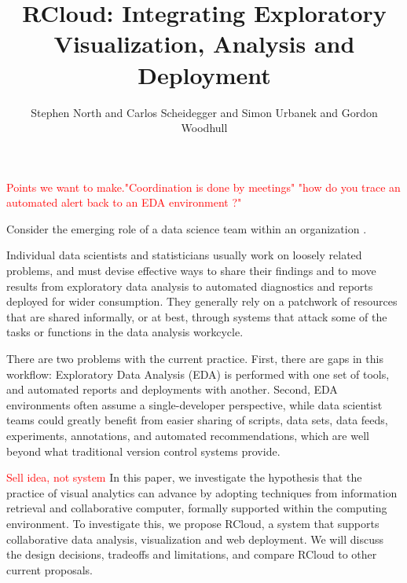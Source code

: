 \documentclass[review,journal]{vgtc}         %
\title{RCloud: Integrating Exploratory Visualization, Analysis and Deployment}
\author{Stephen North and Carlos Scheidegger and Simon Urbanek and
  Gordon Woodhull}
\newcommand{\todo}[1]{\textcolor{red}{#1}}
\begin{document}



\maketitle

\todo{Points we want to make."Coordination is done by meetings" "how do you trace an automated alert back to an EDA environment ?"}

Consider the emerging role of a data science team within an
organization \cite{Keim:2008:VAS}.

Individual data scientists and statisticians usually
work on loosely related problems, and must devise effective ways to 
share their findings and to move results from exploratory data analysis
to automated diagnostics and reports deployed for wider consumption.
They generally rely on a patchwork of resources that are shared informally,
or at best, through systems that attack some of the tasks or functions in
the data analysis workcycle.

There are two problems with the current
practice. First, there are gaps in this workflow:
Exploratory Data Analysis (EDA) is performed with one set of tools,
and automated reports and deployments with another.
Second, EDA environments often assume a single-developer perspective,
while data scientist teams could greatly benefit from easier sharing of
scripts, data sets, data feeds, experiments, annotations, and automated
recommendations, which are well beyond what traditional version control systems provide. 

\todo{Sell idea, not system} In this paper, we investigate the hypothesis
that the practice of visual analytics can advance by adopting techniques
from information retrieval and collaborative computer, formally supported
within the computing environment. To investigate this, we propose RCloud,
a system that supports collaborative data analysis, visualization and
web deployment. We will discuss the design decisions, tradeoffs and
limitations, and compare RCloud to other current proposals.
\end{document}
